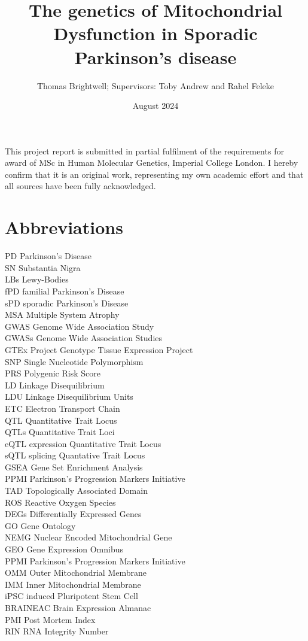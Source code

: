 \documentclass{article}
\title{The genetics of Mitochondrial Dysfunction in Sporadic Parkinson's disease}
\author{Thomas Brightwell; Supervisors: Toby Andrew and Rahel Feleke}
\date{August 2024}
\begin{document}
\maketitle
This project
report is submitted in partial fulfilment of the requirements for award of MSc in Human Molecular
Genetics, Imperial College London. I hereby confirm that it is an original work, representing my
own academic effort and that all sources have been fully acknowledged.
\newpage
\begin{abstract}
\end{abstract}
\renewcommand{\abstractname}{Acknowledgements}
\begin{abstract}
\end{abstract}
\newpage
\tableofcontents
\section{Abbreviations}
PD Parkinson's Disease
\\SN Substantia Nigra
\\LBs Lewy-Bodies
\\fPD familial Parkinson's Disease
\\sPD sporadic Parkinson's Disease
\\MSA Multiple System Atrophy
\\GWAS Genome Wide Association Study
\\GWASs Genome Wide Association Studies
\\GTEx Project Genotype Tissue Expression Project
\\SNP Single Nucleotide Polymorphism
\\PRS Polygenic Risk Score
\\LD Linkage Disequilibrium
\\LDU Linkage Disequilibrium Units
\\ETC Electron Transport Chain
\\QTL Quantitative Trait Locus
\\QTLs Quantitative Trait Loci
\\eQTL expression Quantitative Trait Locus
\\sQTL splicing Quantative Trait Locus
\\GSEA Gene Set Enrichment Analysis
\\PPMI Parkinson's Progression Markers Initiative
\\TAD Topologically Associated Domain
\\ROS Reactive Oxygen Species
\\DEGs Differentially Expressed Genes
\\GO Gene Ontology
\\NEMG Nuclear Encoded Mitochondrial Gene
\\GEO Gene Expression Omnibus
\\PPMI Parkinson's Progression Markers Initiative
\\OMM Outer Mitochondrial Membrane
\\IMM Inner Mitochondrial Membrane
\\iPSC induced Pluripotent Stem Cell
\\BRAINEAC Brain Expression Almanac
\\PMI Post Mortem Index
\\RIN RNA Integrity Number
\end{document}
